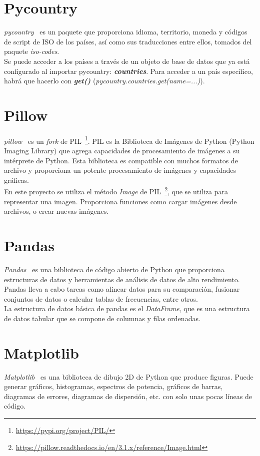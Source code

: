 \documentclass[a4paper, 12pt]{book}
\begin{document}
\section{Pycountry}
\textit{pycountry}~\cite{pycountry:1} es un paquete que proporciona idioma, territorio, moneda y códigos de script de ISO de los países, así como sus traducciones entre ellos, tomados del paquete \textit{iso-codes}.\\

Se puede acceder a los países a través de un objeto de base de datos que ya está configurado al importar pycountry: \textit{\textbf{countries}}. Para acceder a un país específico, habrá que hacerlo con \textit{\textbf{get()}} (\textit{pycountry.countries.get(name=...)}).

\section{Pillow}
\textit{pillow}~\cite{pillow:1} es un \textit{fork} de PIL~\footnote{\url{https://pypi.org/project/PIL/}}. PIL es la Biblioteca de Imágenes de Python (Python Imaging Library) que agrega capacidades de procesamiento de imágenes a su intérprete de Python. Esta biblioteca es compatible con muchos formatos de archivo y proporciona un potente procesamiento de imágenes y capacidades gráficas.\\

En este proyecto se utiliza el método \textit{Image} de PIL~\footnote{\url{https://pillow.readthedocs.io/en/3.1.x/reference/Image.html}}, que se utiliza para representar una imagen. Proporciona funciones como cargar imágenes desde archivos, o crear nuevas imágenes.


\section{Pandas}
\label{pandas}
\textit{Pandas}~\cite{pandas:1} es una biblioteca de código abierto de Python que proporciona estructuras de datos y herramientas de análisis de datos de alto rendimiento. Pandas lleva a cabo tareas como alinear datos para su comparación, fusionar conjuntos de datos o calcular tablas de frecuencias, entre otros.\\

La estructura de datos básica de pandas es el \textit{DataFrame}, que es una estructura de datos tabular que se compone de columnas y filas ordenadas.


\section{Matplotlib}
\label{matplotlib}
\textit{Matplotlib}~\cite{matplotlib:1} es una biblioteca de dibujo 2D de Python que produce figuras. Puede generar gráficos, histogramas, espectros de potencia, gráficos de barras, diagramas de errores, diagramas de dispersión, etc. con solo unas pocas líneas de código.\\
\end{document}
